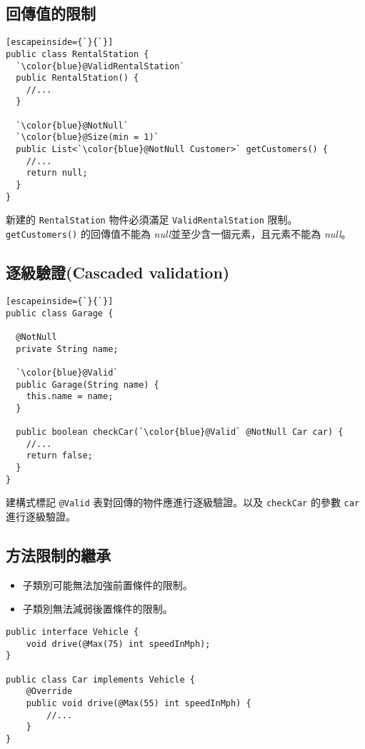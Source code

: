 \subsection{回傳值的限制}

\begin{lstlisting}[escapeinside={`}{`}]
public class RentalStation {
  `\color{blue}@ValidRentalStation`
  public RentalStation() {
    //...
  }

  `\color{blue}@NotNull`
  `\color{blue}@Size(min = 1)`
  public List<`\color{blue}@NotNull Customer>` getCustomers() {
    //...
    return null;
  }
}
\end{lstlisting}

新建的 \texttt{RentalStation} 物件必須滿足 \texttt{ValidRentalStation} 限制。\texttt{getCustomers()} 的回傳值不能為 \textit{null}並至少含一個元素，且元素不能為 \textit{null}。

\subsection{逐級驗證(Cascaded validation)}

\begin{lstlisting}[escapeinside={`}{`}]
public class Garage {

  @NotNull
  private String name;

  `\color{blue}@Valid`
  public Garage(String name) {
    this.name = name;
  }

  public boolean checkCar(`\color{blue}@Valid` @NotNull Car car) {
    //...
    return false;
  }
}
\end{lstlisting}

建構式標記 \texttt{@Valid} 表對回傳的物件應進行逐級驗證。以及 \texttt{checkCar} 的參數 \texttt{car} 進行逐級驗證。

\subsection{方法限制的繼承}

\begin{itemize}
\item 子類別可能無法加強前置條件的限制。
\item 子類別無法減弱後置條件的限制。
\end{itemize}

\begin{lstlisting}
public interface Vehicle {
    void drive(@Max(75) int speedInMph);
}

public class Car implements Vehicle {
    @Override
    public void drive(@Max(55) int speedInMph) {
        //...
    }
}
\end{lstlisting}

